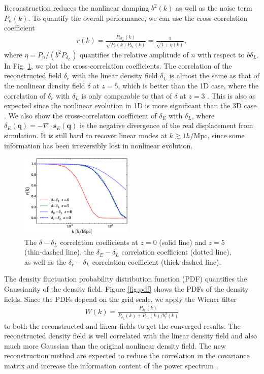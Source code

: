 \documentclass[aps,prd,twocolumn,showpacs,superscriptaddress,groupedaddress,nofootinbib]{revtex4}  %
\newcommand{\mr}{\mathrm}
\newcommand{\bea}{\begin{eqnarray}}
\newcommand{\eea}{\end{eqnarray}}
\begin{document}
Reconstruction reduces the nonlinear damping $b^2(k)$ as well as the
noise term $P_{n}(k)$. To quantify the overall performance, we can use the
cross-correlation coefficient
\bea
r(k)=\frac{P_{\delta\delta_L}(k)}
{\sqrt{P_{\delta}(k)P_{\delta_L}(k)}}
=\frac{1}{\sqrt{1+\eta(k)}},
\eea
where $\eta=P_n/(b^2P_{\delta_L})$ quantifies the relative amplitude
of $n$ with respect to $b\delta_L$. 
In Fig. \ref{fig:xcc}, we plot the cross-correlation coefficients.
The correlation of the reconstructed field $\delta_r$ with the linear density
field $\delta_L$ is almost the same as that of the nonlinear density field 
$\delta$ at $z=5$, which is better than the 1D case, where the correlation of
$\delta_r$ with $\delta_L$ is only comparable to that of $\delta$ 
at $z=3$ \cite{2016arXiv160907041Z}.
This is also as expected since the nonlinear evolution in 1D is more
significant than the 3D case \cite{2016matt}.
We also show the cross-correlation coefficient of $\delta_E$ with $\delta_L$,
where $\delta_E(\bm{q})=-\nabla\cdot \bm{s}_E(\bm{q})$ is the negative 
divergence of the real displacement from simulation.
It is still hard to recover linear modes at $k\gtrsim1h/\mr{Mpc}$, since some information has been irreversibly lost in nonlinear evolution. 


\begin{figure}[tbp]
\begin{center}
\includegraphics[width=0.48\textwidth]{fa.eps}
\end{center}
\vspace{-0.7cm}
\caption{
The $\delta-\delta_L$ correlation coefficients at $z=0$ (solid
line) and $z=5$ (thin-dashed line), the $\delta_E-\delta_L$ correlation
coefficient (dotted line), as well as the $\delta_r-\delta_L$
correlation coefficient (thick-dashed line).}
    
\label{fig:xcc}
\end{figure}

The density fluctuation probability distribution function (PDF) quantifies 
the Gaussianity of the density field. 
Figure \ref{fig:pdf} shows the PDFs of the density fields. 
Since the PDFs depend on the grid scale, we apply the Wiener filter
\bea
W(k)=\frac{P_{\delta_L}(k)}{P_{\delta_L}(k)+P_{n_r}(k)/b_r^2(k)}
\eea
to both the reconstructed and linear fields to get the converged results.
The reconstructed density field is well correlated with the linear density 
field and also much more Gaussian than the original nonlinear density field.
The new reconstruction method are expected to reduce the correlation in the 
covariance matrix and increase the information content of the power spectrum
\cite{1999MNRAS.308.1179M,1999ApJ...527....1S,2005MNRAS.360L..82R}.
\end{document}
